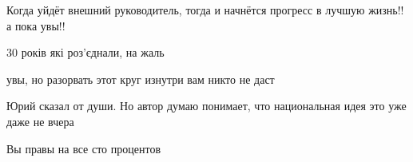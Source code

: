 \begin{itemize}
Когда уйдёт внешний руководитель, тогда и начнётся прогресс в лучшую жизнь!! а пока увы!!

 
30 років які роз'єднали, на жаль

 
увы, но разорвать этот круг изнутри вам никто не даст

 
Юрий сказал от души. Но автор думаю понимает, что национальная идея это уже даже не вчера

 
Вы правы на все сто процентов

\end{itemize}

